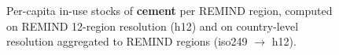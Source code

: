 \begin{figure}[htbp]
    \centering
    \caption{Per-capita in-use stocks of \textbf{cement} per REMIND region, computed on REMIND 12-region resolution (h12) and on country-level resolution aggregated to REMIND regions (iso249 $\rightarrow$ h12).}
    \label{fig:pcstocks_cement_h12_vs_iso249}
\end{figure}

\clearpage
